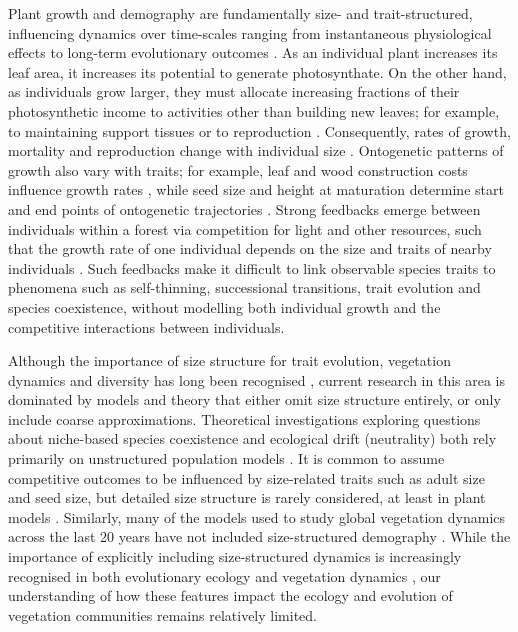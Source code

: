 \documentclass[a4paper,11pt]{article}
\begin{document}
Plant growth and demography are fundamentally size- and
trait-structured, influencing dynamics over time-scales ranging from
instantaneous physiological effects to long-term evolutionary outcomes
\citep{Harper-1977, Westoby-2002, Griffith-2016, Rees-2016}.
%
As an individual plant increases its leaf area, it increases its potential
to generate photosynthate.
%
On the other hand, as individuals grow larger, they must allocate increasing
fractions of their photosynthetic income to activities other
than building new leaves; for example, to maintaining support tissues
\citep{Givnish-1988, Enquist-2007} or to reproduction
\citep{Thomas-2011}.
%
Consequently, rates of growth, mortality and reproduction change with
individual size \citep{Muller-2006, Ruger-2011, Thomas-2011}.
Ontogenetic
patterns of growth also vary with traits; for example,
leaf and wood construction costs influence growth rates
\citep{Falster-2011, Visser-2016}, while seed size and height
at maturation determine start and end points of ontogenetic
trajectories \citep{Westoby-2002}.
%
Strong feedbacks emerge between individuals within a forest via
competition for light and other resources, such that the growth rate
of one individual depends on the size and traits of nearby
individuals \citep{Shugart-1980, Pacala-1996}.
%
Such feedbacks make it difficult to link observable species traits to
phenomena such as self-thinning, successional transitions, trait
evolution and species coexistence, without
modelling both individual growth and the competitive interactions between
individuals.

Although the importance of size structure for trait evolution, vegetation
dynamics and diversity has long been recognised \citep[e.g.,][]{Harper-1977,
 Shugart-1980, Huston-1987}, current research in this area is
dominated by models and theory that either omit size structure
entirely, or only include coarse approximations.
%
Theoretical investigations exploring questions about niche-based
species coexistence and ecological drift (neutrality) both rely
primarily on unstructured population models \citep[e.g.,][]{MacArthur-1967,
 Tilman-1985, Geritz-1998, Hubbell-2001, Calcagno-2006}.
%
It is common to assume competitive outcomes to be influenced by
size-related traits such as adult size and seed size, but detailed
size structure is rarely considered, at least in plant models
\cite[for animal examples, see][]{Deroos-1997}.
%
Similarly, many of the models used to study global vegetation dynamics across
the last 20 years have not included size-structured demography
\citep[for comparisons of some major models, see][]{Sitch-2008,
Dekauwe-2014}.
%
While the importance of explicitly including size-structured dynamics is
increasingly recognised in both evolutionary ecology
\citep[e.g.,][]{Falster-2015, Rees-2016} and vegetation dynamics
\citep[e.g.,][]{Moorcroft-2001, Purves-2008, Smith-2014,
Weng-2015, Sakschewski-2015}, our understanding of how these features
impact the ecology and evolution of vegetation communities remains
relatively limited.
\end{document}
